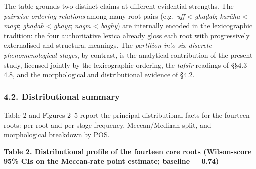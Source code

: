 \documentclass[11pt,a4paper]{article}
\begin{document}
The table grounds two distinct claims at different evidential strengths.
The \emph{pairwise ordering relations} among many root-pairs
(e.g.~\emph{uff} \textless{} \emph{ghaḍab}; \emph{karāha} \textless{}
\emph{maqt}; \emph{ghaḍab} \textless{} \emph{ghayẓ}; \emph{naqm}
\textless{} \emph{baghy}) are internally encoded in the lexicographic
tradition: the four authoritative lexica already gloss each root with
progressively externalised and structural meanings. The \emph{partition
into six discrete phenomenological stages}, by contrast, is the
analytical contribution of the present study, licensed jointly by the
lexicographic ordering, the \emph{tafsīr} readings of §§4.3--4.8, and
the morphological and distributional evidence of §4.2.

\subsubsection{4.2. Distributional
summary}\label{distributional-summary}

Table 2 and Figures 2--5 report the principal distributional facts for
the fourteen roots: per-root and per-stage frequency, Meccan/Medinan
split, and morphological breakdown by POS.

\textbf{Table 2. Distributional profile of the fourteen core roots
(Wilson-score 95\% CIs on the Meccan-rate point estimate; baseline =
0.74)}
\end{document}
